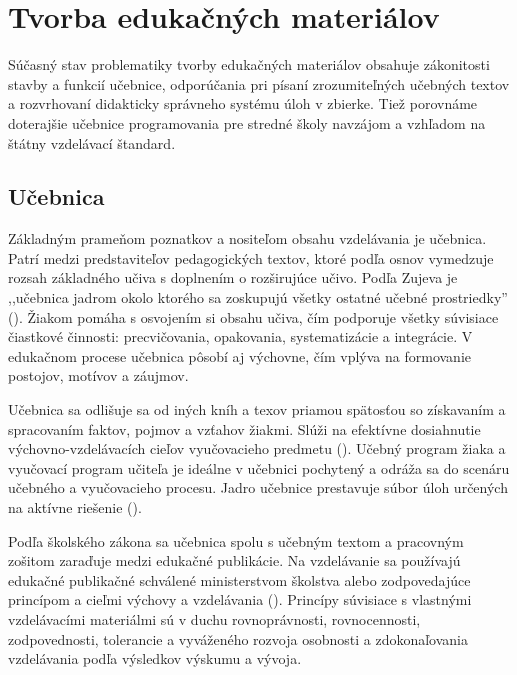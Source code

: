 \chapter{Tvorba edukačných materiálov} 
Súčasný stav problematiky tvorby edukačných materiálov obsahuje zákonitosti stavby a funkcií učebnice, odporúčania pri písaní zrozumiteľných učebných textov a rozvrhovaní didakticky správneho systému úloh v zbierke. Tiež porovnáme doterajšie učebnice programovania pre stredné školy navzájom a vzhľadom na štátny vzdelávací štandard. 

\section{Učebnica}
Základným prameňom poznatkov a nositeľom obsahu vzdelávania je učebnica. Patrí medzi predstaviteľov pedagogických textov, ktoré podľa osnov vymedzuje rozsah základného učiva s doplnením o rozširujúce učivo. Podľa Zujeva je ,,učebnica jadrom okolo ktorého sa zoskupujú všetky ostatné učebné prostriedky'' (\cite{zujev_ako_1986}). Žiakom pomáha s osvojením si obsahu učiva, čím podporuje všetky súvisiace čiastkové činnosti: precvičovania, opakovania, systematizácie a integrácie. V edukačnom procese učebnica pôsobí aj výchovne, čím vplýva na formovanie postojov, motívov a záujmov. 

Učebnica sa odlišuje sa od iných kníh a texov priamou spätosťou so získavaním a spracovaním faktov, pojmov a vzťahov žiakmi. Slúži na efektívne dosiahnutie výchovno-vzdelávacích cieľov vyučovacieho predmetu (\cite{gavora_ziak_1992}). Učebný program žiaka a vyučovací program učiteľa je ideálne v učebnici pochytený a odráža sa do scenáru učebného a vyučovacieho procesu. Jadro učebnice prestavuje súbor úloh určených na aktívne riešenie (\cite{pavlovkin_ziak_1989}).

Podľa školského zákona sa učebnica spolu s učebným textom a pracovným zošitom zaraďuje medzi edukačné publikácie. Na vzdelávanie sa používajú edukačné publikačné schválené ministerstvom školstva alebo zodpovedajúce princípom a cieľmi výchovy a vzdelávania (\cite{skolsky_zakon}). Princípy súvisiace s vlastnými vzdelávacími materiálmi sú v duchu rovnoprávnosti, rovnocennosti, zodpovednosti, tolerancie a vyváženého rozvoja osobnosti a zdokonaľovania vzdelávania podľa výsledkov výskumu a vývoja.


